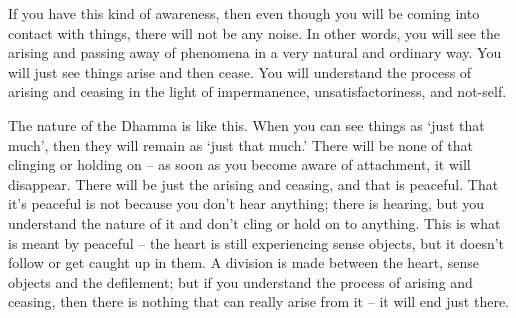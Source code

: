 If you have this kind of awareness, then even though you will be coming
into contact with things, there will not be any noise. In other words, 
you will see the arising and passing away of phenomena in a very natural
and ordinary way. You will just see things arise and then cease. You
will understand the process of arising and ceasing in the light of
impermanence, unsatisfactoriness, and not-self. 

The nature of the Dhamma is like this. When you can see things as `just
that much', then they will remain as `just that much.' There will be
none of that clinging or holding on -- as soon as you become aware of
attachment, it will disappear. There will be just the arising and
ceasing, and that is peaceful. That it's peaceful is not because you
don't hear anything; there is hearing, but you understand the nature of
it and don't cling or hold on to anything. This is what is meant by
peaceful -- the heart is still experiencing sense objects, but it
doesn't follow or get caught up in them. A division is made between the
heart, sense objects and the defilement; but if you understand the
process of arising and ceasing, then there is nothing that can really
arise from it -- it will end just there. 

